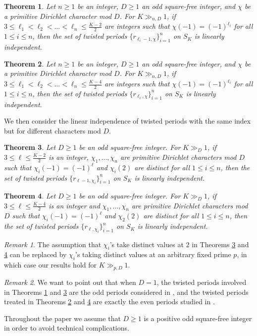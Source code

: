 \documentclass[11pt,letterpaper,reqno]{amsart}
\numberwithin{figure}{section}
\numberwithin{table}{section}
\theoremstyle{definition}
\theoremstyle{plain}
\newtheorem{theorem}{Theorem}[section]
\theoremstyle{definition}
\theoremstyle{definition}
\theoremstyle{remark}
\newtheorem{remark}{Remark}[section]
\numberwithin{equation}{section}
\theoremstyle{remark}
\begin{document}
\begin{theorem}\label{thm:mainthmfixDdifferentell}
    Let $n\geq1$ be an integer, $D\geq1$ an odd square-free integer, and $\chi$ be a primitive Dirichlet character mod $D$. For $K\gg_{n,D}1$, if $3\leq\ell_1<\ell_2<...<\ell_n\leq\frac{K-2}{2}$ are integers such that $\chi(-1)=(-1)^{\ell_i}$ for all $1\leq i\leq n$, then the set of twisted periods $\{r_{\ell_i-1,\chi}\}_{i=1}^n$ on $S_{K}$ is linearly independent. 
\end{theorem}
\begin{theorem}\label{thm:mainthmfixDdifferentell2}
    Let $n\geq1$ be an integer, $D\geq1$ an odd square-free integer, and $\chi$ be a primitive Dirichlet character mod $D$. For $K\gg_{n,D}1$, if $3\leq\ell_1<\ell_2<...<\ell_n\leq\frac{K-4}{2}$ are integers such that $\chi(-1)=(-1)^{\ell_i}$ for all $1\leq i\leq n$, then the set of twisted periods $\{r_{\ell_i,\chi}\}_{i=1}^n$ on $S_{K}$ is linearly independent. 
\end{theorem}

We then consider the linear independence of twisted periods with the same index but for different characters mod $D$. 
\begin{theorem}\label{thm:twistbydifferentD}
    Let $D\geq1$ be an odd square-free integer. For $K\gg_D1$, if $3\leq\ell\leq\frac{K-2}{2}$ is an integer, $\chi_1,...,\chi_n$ are primitive Dirichlet characters mod $D$ such that $\chi_i(-1)=(-1)^{\ell}$ and $\chi_i(2)$ are distinct for all $1\leq i\leq n$, then the set of twisted periods $\{r_{\ell-1,\chi_i}\}_{i=1}^n$ on $S_K$ is linearly independent.
\end{theorem}
\begin{theorem}\label{thm:twistbydifferentD2}
     Let $D\geq1$ be an odd square-free integer. For $K\gg_D1$, if $3\leq\ell\leq\frac{K-4}{2}$ is an integer and $\chi_1,...,\chi_n$ are primitive Dirichlet characters mod $D$ such that $\chi_i(-1)=(-1)^{\ell}$ and $\chi_2(2)$ are distinct for all $1\leq i\leq n$, then the set of twisted periods $\{r_{\ell,\chi_i}\}_{i=1}^n$ on $S_K$ is linearly independent.
\end{theorem}
\begin{remark}
    The assumption that $\chi_i$'s take distinct values at $2$ in Theorems \ref{thm:twistbydifferentD} and \ref{thm:twistbydifferentD2} can be replaced by $\chi_i$'s taking distinct values at an arbitrary fixed prime $p$, in which case our results hold for $K\gg_{p,D}1$.
\end{remark}
\begin{remark}We want to point out that when $D=1$, the twisted periods involved in Theorems \ref{thm:mainthmfixDdifferentell} and \ref{thm:twistbydifferentD} are the odd periods considered in \cite{oddperiods}, and the twisted periods treated in Theorems \ref{thm:mainthmfixDdifferentell2} and \ref{thm:twistbydifferentD2} are exactly the even periods studied in \cite{evenperiods}.\end{remark}
Throughout the paper we assume that $D\geq1$ is a positive odd square-free integer in order to avoid technical complications.
\end{document}
